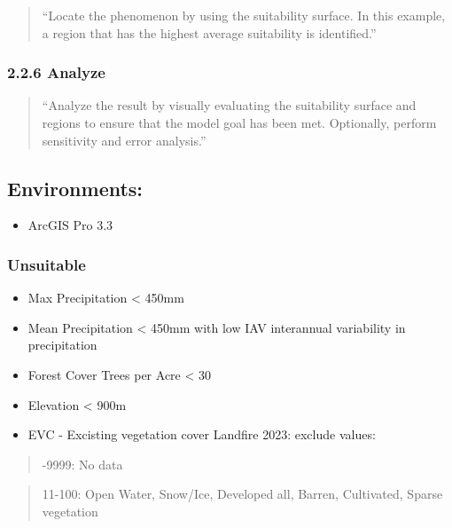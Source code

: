 \documentclass[
]{agujournal2019}
\providecommand{\tightlist}{%
  \setlength{\itemsep}{0pt}\setlength{\parskip}{0pt}}\usepackage{longtable,booktabs,array}
\begin{document}
\begin{quote}
``Locate the phenomenon by using the suitability surface. In this
example, a region that has the highest average suitability is
identified.''
\end{quote}

\subsubsection{2.2.6 Analyze}\label{analyze}

\begin{quote}
``Analyze the result by visually evaluating the suitability surface and
regions to ensure that the model goal has been met. Optionally, perform
sensitivity and error analysis.''
\end{quote}

\subsection{Environments:}\label{environments}

\begin{itemize}
\tightlist
\item
  ArcGIS Pro 3.3
\end{itemize}

\subsubsection{\texorpdfstring{\textbf{Unsuitable}}{Unsuitable}}\label{unsuitable}

\begin{itemize}
\item
  Max Precipitation \textless{} 450mm
\item
  Mean Precipitation \textless{} 450mm with low IAV interannual
  variability in precipitation
\item
  Forest Cover Trees per Acre \textless{} 30
\item
  Elevation \textless{} 900m
\item
  EVC - Excisting vegetation cover Landfire 2023: exclude values:
\end{itemize}

\begin{quote}
-9999: No data
\end{quote}

\begin{quote}
11-100: Open Water, Snow/Ice, Developed all, Barren, Cultivated, Sparse
vegetation
\end{quote}
\end{document}
